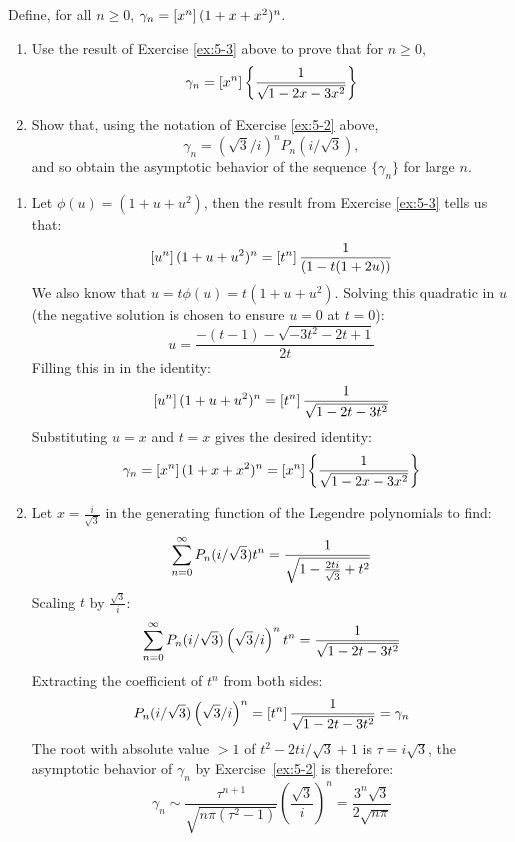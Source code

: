 \begin{exercise}
    Define, for all $n\geq 0$, $\gamma_n = \coeff{x^n}(1+x+x^2)^n$.
    \begin{enumerate}[label=(\alph*)]
        \item Use the result of Exercise \ref{ex:5-3} above to prove that for $n\geq0$,
        \[
            \gamma_n = \coeff{x^n}\left\{\frac{1}{\sqrt{1-2x-3x^2}}\right\}
        \]
        \item Show that, using the notation of Exercise \ref{ex:5-2} above,
        \[
            \gamma_n = \left(\sqrt{3}/i\right)^n P_n(i/\sqrt{3}),
        \]
        and so obtain the asymptotic behavior of the sequence $\{\gamma_n\}$ for large $n$.
    \end{enumerate}
\end{exercise}
\begin{solution}
    \begin{enumerate}[label=(\alph*)]
        \item Let $\phi(u) = (1+u+u^2)$, then the result from Exercise \ref{ex:5-3} tells us that:
        \[
            \coeff{u^n} (1+u+u^2)^n = \coeff{t^n} \frac{1}{(1-t(1+2u))}
        \]
        We also know that $u=t\phi(u)  = t(1+u+u^2)$. Solving this quadratic in $u$ (the negative solution is chosen to ensure $u=0$ at $t=0$):
        \[
            u = \frac{-(t-1) - \sqrt{-3t^2 -2t+1}}{2t}
        \]
        Filling this in in the identity:
        \[
            \coeff{u^n} (1+u+u^2)^n = \coeff{t^n} \frac{1}{\sqrt{1-2t-3t^2}}
        \]
        Substituting $u=x$ and $t=x$ gives the desired identity:
        \[
            \gamma_n = \coeff{x^n} (1+x+x^2)^n =  \coeff{x^n}\left\{\frac{1}{\sqrt{1-2x-3x^2}}\right\}
        \]
        \item Let $x=\frac{i}{\sqrt{3}}$ in the generating function of the Legendre polynomials to find:
        \[
            \bsum[n] P_n(i/\sqrt{3})t^n = \frac{1}{\sqrt{1-\frac{2ti}{\sqrt{3}}+t^2}}
        \]
        Scaling $t$ by $\frac{\sqrt{3}}{i}$:
        \[
            \bsum[n] P_n(i/\sqrt{3})\left(\sqrt{3}/i\right)^nt^n = \frac{1}{\sqrt{1-2t-3t^2}}
        \]
        Extracting the coefficient of $t^n$ from both sides:
        \[
            P_n(i/\sqrt{3})\left(\sqrt{3}/i\right)^n = \coeff{t^n} \frac{1}{\sqrt{1-2t-3t^2}} = \gamma_n
        \]
        The root with absolute value $>1$ of $t^2 - 2ti/\sqrt{3} + 1$ is $\tau = i\sqrt{3}$, the asymptotic behavior of $\gamma_n$ by Exercise~\ref{ex:5-2} is therefore:
        \[
            \gamma_n \sim \frac{\tau^{n+1}}{\sqrt{n\pi(\tau^2-1)}} \left(\frac{\sqrt{3}}{i}\right)^n = \frac{3^n\sqrt{3}}{2\sqrt{n\pi}}
        \]
    \end{enumerate}
\end{solution}

